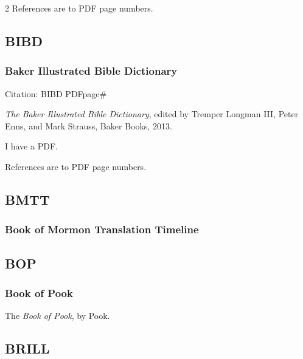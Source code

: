 \begin{multicols}{2}
			References are to PDF page numbers.
			
	\subsection*{BIBD}
	
		\subsubsection*{Baker Illustrated Bible Dictionary}
		
			Citation:
				BIBD PDFpage\#
				
			\textit{The Baker Illustrated Bible Dictionary}, edited by Tremper Longman III, Peter Enns, and Mark Strauss, Baker Books, 2013.
			
			I have a PDF.
			
			References are to PDF page numbers.
			
	\subsection*{BMTT}
	
		\subsubsection*{Book of Mormon Translation Timeline}
		
			\phantom{.}
			
	\subsection*{BOP}
	
		\subsubsection*{Book of Pook}
		
			The \textit{Book of Pook}, by Pook.
			
	\subsection*{BRILL}
	

\end{multicols}
